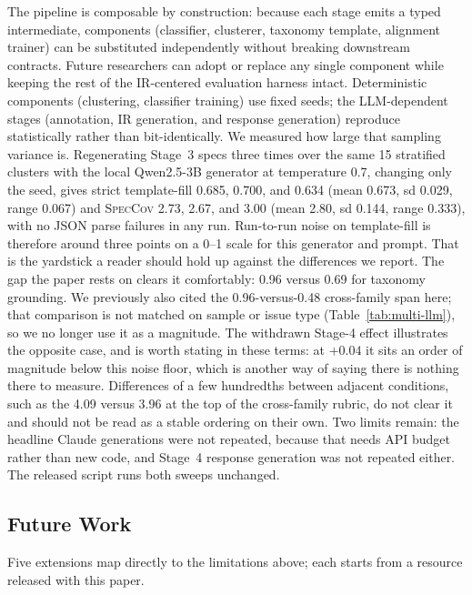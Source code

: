 \documentclass[preprint,12pt]{elsarticle}
\begin{document}
The pipeline is composable by construction: because each stage emits a typed intermediate, components (classifier, clusterer, taxonomy template, alignment trainer) can be substituted independently without breaking downstream contracts. Future researchers can adopt or replace any single component while keeping the rest of the IR-centered evaluation harness intact. Deterministic components (clustering, classifier training) use fixed seeds; the LLM-dependent stages (annotation, IR generation, and response generation) reproduce statistically rather than bit-identically. We measured how large that sampling variance is. Regenerating Stage~3 specs three times over the same 15 stratified clusters with the local Qwen2.5-3B generator at temperature 0.7, changing only the seed, gives strict template-fill 0.685, 0.700, and 0.634 (mean 0.673, sd 0.029, range 0.067) and \textsc{SpecCov} 2.73, 2.67, and 3.00 (mean 2.80, sd 0.144, range 0.333), with no JSON parse failures in any run. Run-to-run noise on template-fill is therefore around three points on a 0--1 scale for this generator and prompt. That is the yardstick a reader should hold up against the differences we report. The gap the paper rests on clears it comfortably: 0.96 versus 0.69 for taxonomy grounding. We previously also cited the 0.96-versus-0.48 cross-family span here; that comparison is not matched on sample or issue type (Table~\ref{tab:multi-llm}), so we no longer use it as a magnitude. The withdrawn Stage-4 effect illustrates the opposite case, and is worth stating in these terms: at $+0.04$ it sits an order of magnitude below this noise floor, which is another way of saying there is nothing there to measure. Differences of a few hundredths between adjacent conditions, such as the 4.09 versus 3.96 at the top of the cross-family rubric, do not clear it and should not be read as a stable ordering on their own. Two limits remain: the headline Claude generations were not repeated, because that needs API budget rather than new code, and Stage~4 response generation was not repeated either. The released script runs both sweeps unchanged.

\subsection{Future Work}\label{future-work}
Five extensions map directly to the limitations above; each starts from a resource released with this paper.
\end{document}
